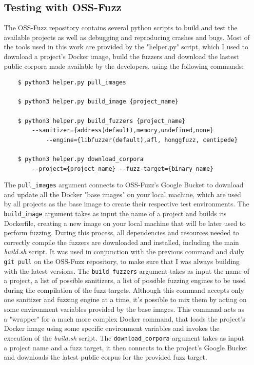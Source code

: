 \subsection{Testing with OSS-Fuzz} \label{test}
The OSS-Fuzz repository contains several python scripts to build and test the available projects as well as debugging and reproducing crashes and bugs. Most of the tools used in this work are provided by the "helper.py" script, which I used to download a project's Docker image, build the fuzzers and download the lastest public corpora made available by the developers, using the following commands:
\begin{verbatim}
    $ python3 helper.py pull_images 

    $ python3 helper.py build_image {project_name}

    $ python3 helper.py build_fuzzers {project_name}
        --sanitizer={address(default),memory,undefined,none} 
            --engine={libfuzzer(default),afl, honggfuzz, centipede}
        
    $ python3 helper.py download_corpora 
        --project={project_name} --fuzz-target={binary_name}
\end{verbatim}

The \verb|pull_images| argument connects to OSS-Fuzz's Google Bucket to download and update all the Docker "base images" on your local machine, which are used by all projects as the base image to create their respective test environments.
The \verb|build_image| argument takes as input the name of a project and builds its Dockerfile, creating a new image on your local machine that will be later used to perform fuzzing. During this process, all dependencies and resources needed to correctly compile the fuzzers are downloaded and installed, including the main \textit{build.sh} script. It was used in conjunction with the previous command and daily \verb|git pull| on the OSS-Fuzz repository, to make sure that I was always building with the latest versions. 
The \verb|build_fuzzers| argument takes as input the name of a project, a list of possible sanitizers, a list of possible fuzzing engines to be used during the compilation of the fuzz targets. Although this command accepts only one sanitizer and fuzzing engine at a time, it's possible to mix them by acting on some environment variables provided by the base images. This command acts as a "wrapper" for a much more complex Docker command, that loads the project's Docker image using some specific environment variables and invokes the execution of the \textit{build.sh} script.
The \verb|download_corpora| argument takes as input a project name and a fuzz target, it then connects to the project's Google Bucket and downloads the latest public corpus for the provided fuzz target.

